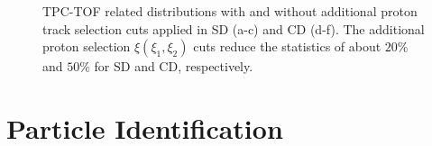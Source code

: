 \begin{figure}[H]
{		\begin{subfigure}[b]{\linewidth}{
				}
		\end{subfigure}
	}
	\quad
	\parbox{0.31\textwidth}{
		\centering
		\begin{subfigure}[b]{\linewidth}{
				}
		\end{subfigure}
	}
   
	\caption[TPC-TOF related distributions with and without additional proton track selection cuts applied in SD and CD]{TPC-TOF related distributions with and without additional proton track selection cuts applied in SD (a-c) and CD (d-f). The additional proton selection $\xi\left(\xi_1,\xi_2\right)$ cuts reduce the statistics of about $20\%$ and $50\%$ for SD and CD, respectively.}
	\label{fig:reduction}
\end{figure}
\section{Particle Identification}

